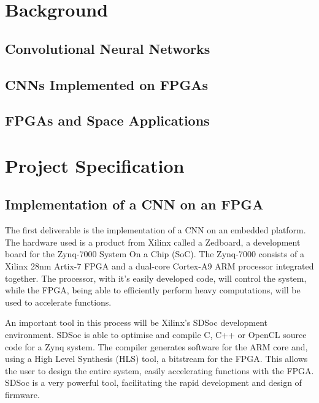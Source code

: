 \documentclass[11pt]{article}
\begin{document}
\section{Background}
\label{sec:Background}

\subsection{Convolutional Neural Networks}
\label{sec:ConvolutionalNeuralNetworks}

\subsection{CNNs Implemented on FPGAs}
\label{sec:CNNsImplementedOnFPGAs}

\subsection{FPGAs and Space Applications}
\label{sec:FPGAsAndSpaceApplications}

\section{Project Specification}
\label{sec:ProjectSpecification}

\subsection{Implementation of a CNN on an FPGA}
\label{sec:ImplementationOfACNNOnAnFPGA}

The first deliverable is the implementation of a CNN on an embedded platform. The hardware used is a product from Xilinx called a Zedboard, a development board for the Zynq-7000 System On a Chip (SoC). The Zynq-7000 consists of a Xilinx 28nm Artix-7 FPGA and a dual-core Cortex-A9 ARM processor integrated together. The processor, with it's easily developed code, will control the system, while the FPGA, being able to efficiently perform heavy computations, will be used to accelerate functions.

An important tool in this process will be Xilinx's SDSoc development environment. SDSoc is able to optimise and compile C, C++ or OpenCL source code for a Zynq system. The compiler generates software for the ARM core and, using a High Level Synthesis (HLS) tool, a bitstream for the FPGA. This allows the user to design the entire system, easily accelerating functions with the FPGA. SDSoc is a very powerful tool, facilitating the rapid development and design of firmware.
\end{document}
